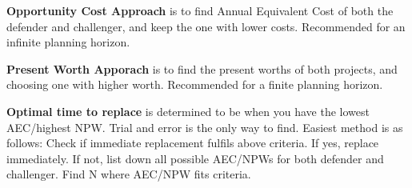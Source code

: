 \documentclass[landscape, letterpaper, 10pt]{article}
\begin{document}
\begin{multicols}{3}
    \textbf{Opportunity Cost Approach} is to find Annual Equivalent Cost of both the defender and challenger, and keep the one with lower costs. Recommended for an infinite planning horizon.

    \textbf{Present Worth Apporach} is to find the present worths of both projects, and choosing one with higher worth. Recommended for a finite planning horizon.

    \textbf{Optimal time to replace} is determined to be when you have the lowest AEC/highest NPW. Trial and error is the only way to find. Easiest method is as follows: Check if immediate replacement fulfils above criteria. If yes, replace immediately. If not, list down all possible AEC/NPWs for both defender and challenger. Find N where AEC/NPW fits criteria.

\end{multicols}
\end{document}
